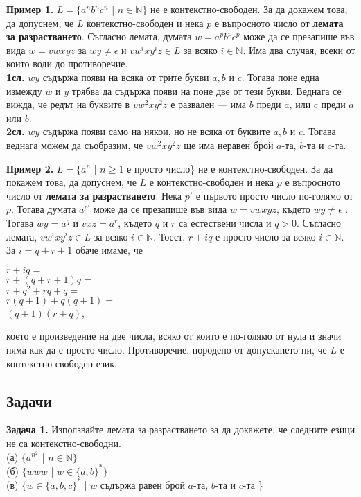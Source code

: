 \documentclass[openany]{book}
\begin{document}
\vspace{15pt}

\textbf{Пример 1.} $L = \{a^nb^nc^n$ | $n \in \mathbb{N}\}$ не е контекстно-свободен. За да докажем
това, да допуснем, че $L$ контекстно-свободен и нека $p$ е въпросното число от 
\textbf{лемата за разрастването}. Съгласно лемата, думата $w = a^pb^pc^p$ може да се 
презапише във вида $w = vwxyz$ за $wy \neq \epsilon$ и $vw^ixy^iz \in L$ за всяко
$i \in \mathbb{N}$. Има два случая, всеки от които води до противоречие. \\
\textbf{1сл.} $wy$ съдържа появи на всяка от трите букви $a,b$ и $c$. Тогава поне една
измежду $w$ и $y$ трябва да съдържа появи на поне две от тези букви. Веднага се вижда, че 
редът на буквите в $vw^2xy^2z$ е развален — има $b$ преди $a$, или $c$ преди $a$ или $b$. \\
\textbf{2сл.} $wy$ съдържа появи само на някои, но не всяка от буквите $a,b$ и $c$. 
Тогава веднага можем да съобразим, че $vw^2xy^2z$ ще има неравен брой $a$-та, $b$-та и
$c$-та.


\vspace{15pt}

\textbf{Пример 2.} $L = \{a^n$ | $n \geq 1$ е просто число\} не е контекстно-свободен.
За да покажем това, да допуснем, че $L$ е контекстно-свободен и нека $p$ е въпросното
число от \textbf{лемата за разрастването}. Нека $p'$ е първото просто число по-голямо
от $p$. Тогава думата $a^{p'}$ може да се презапише във вида $w = vwxyz$, където $wy \neq \epsilon$
. Тогава $wy = a^q$ и $vxz = a^r$, където $q$ и $r$ са естествени числа и $q > 0$. Съгласно
лемата, $vw^ixy^iz \in L$ за всяко $i \in \mathbb{N}$. Тоест, $r + iq$ е просто число
за всяко $i \in \mathbb{N}$. За $i = q+r+1$ обаче имаме, че \\
\begin{center}
$r + iq = $ \\
$r + (q+r+1)q = $ \\
$r + q^2 + rq + q = $ \\
$r(q+1) + q(q+1) = $ \\
$(q+1)(r+q)$, \\
\end{center}
което е произведение на две числа, всяко от които е по-голямо от нула и значи няма как
да е просто число. Противоречие, породено от допускането ни, че $L$ е контекстно-свободен 
език.
\vspace{25pt}

\subsection{Задачи} 
\textbf{Задача 1.} Използвайте лемата за разрастването за да докажете, че следните езици
не са контекстно-свободни. \\
(а) $\{a^{n^2}$ | $n \in \mathbb{N}\}$ \\
(б) $\{www$ | $w \in \{a,b\}^*\}$ \\
(в) $\{w \in \{a,b,c\}^*$ | $w$ съдържа равен брой $a$-та, $b$-та и $c$-та \} \\
\end{document}
